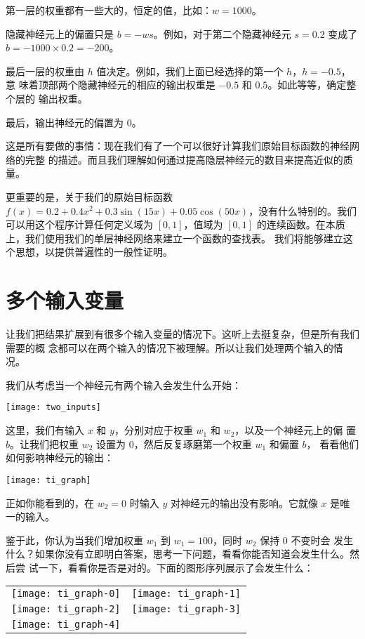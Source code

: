 第一层的权重都有一些大的，恒定的值，比如：$w = 1000$。

隐藏神经元上的偏置只是 $b = -w s$。例如，对于第二个隐藏神经元 $s = 0.2$ 变成了
$b = -1000 \times 0.2 = -200$。

最后一层的权重由 $h$ 值决定。例如，我们上面已经选择的第一个 $h$，$h = -0.5$，意
味着顶部两个隐藏神经元的相应的输出权重是 $-0.5$ 和 $0.5$。如此等等，确定整个层的
输出权重。

最后，输出神经元的偏置为 $0$。

这是所有要做的事情：现在我们有了一个可以很好计算我们原始目标函数的神经网络的完整
的描述。而且我们理解如何通过提高隐层神经元的数目来提高近似的质量。

更重要的是，关于我们的原始目标函数 $f(x) = 0.2+0.4 x^2+0.3 \sin(15 x) + 0.05
\cos(50 x)$，没有什么特别的。我们可以用这个程序计算任何定义域为 $[0, 1]$，值域为
$[0, 1]$ 的连续函数。在本质上，我们使用我们的单层神经网络来建立一个函数的查找表。
我们将能够建立这个思想，以提供普遍性的一般性证明。

\section{多个输入变量}
\label{sec:many_input_variables}

让我们把结果扩展到有很多个输入变量的情况下。这听上去挺复杂，但是所有我们需要的概
念都可以在两个输入的情况下被理解。所以让我们处理两个输入的情况。

我们从考虑当一个神经元有两个输入会发生什么开始：
\begin{center}
  \texttt{[image: two\_inputs]}
\end{center}

这里，我们有输入 $x$ 和 $y$，分别对应于权重 $w_1$ 和 $w_2$，以及一个神经元上的偏
置 $b$。让我们把权重 $w_2$ 设置为 $0$，然后反复琢磨第一个权重 $w_1$ 和偏置 $b$，
看看他们如何影响神经元的输出：
\begin{center}
  \texttt{[image: ti\_graph]}
\end{center}

正如你能看到的，在 $w_2 = 0$ 时输入 $y$ 对神经元的输出没有影响。它就像 $x$ 是唯
一的输入。

鉴于此，你认为当我们增加权重 $w_1$ 到 $w_1 = 100$，同时 $w_2$ 保持 $0$ 不变时会
发生什么？如果你没有立即明白答案，思考一下问题，看看你能否知道会发生什么。然后尝
试一下，看看你是否是对的。下面的图形序列展示了会发生什么：
\begin{center}
  \begin{tabular}{c c}
  \texttt{[image: ti\_graph-0]} & \texttt{[image: ti\_graph-1]}\\
  \texttt{[image: ti\_graph-2]} & \texttt{[image: ti\_graph-3]}\\
  \texttt{[image: ti\_graph-4]} & \\
  \end{tabular}
\end{center}

